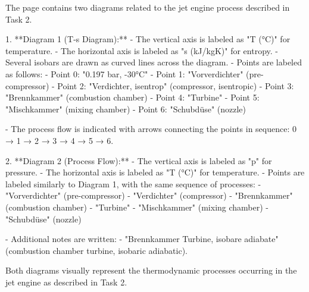 The page contains two diagrams related to the jet engine process described in Task 2.  

1. **Diagram 1 (T-s Diagram):**  
   - The vertical axis is labeled as "T (°C)" for temperature.  
   - The horizontal axis is labeled as "s (kJ/kgK)" for entropy.  
   - Several isobars are drawn as curved lines across the diagram.  
   - Points are labeled as follows:  
     - Point 0: "0.197 bar, -30°C"  
     - Point 1: "Vorverdichter" (pre-compressor)  
     - Point 2: "Verdichter, isentrop" (compressor, isentropic)  
     - Point 3: "Brennkammer" (combustion chamber)  
     - Point 4: "Turbine"  
     - Point 5: "Mischkammer" (mixing chamber)  
     - Point 6: "Schubdüse" (nozzle)  

   - The process flow is indicated with arrows connecting the points in sequence:  
     0 → 1 → 2 → 3 → 4 → 5 → 6.  

2. **Diagram 2 (Process Flow):**  
   - The vertical axis is labeled as "p" for pressure.  
   - The horizontal axis is labeled as "T (°C)" for temperature.  
   - Points are labeled similarly to Diagram 1, with the same sequence of processes:  
     - "Vorverdichter" (pre-compressor)  
     - "Verdichter" (compressor)  
     - "Brennkammer" (combustion chamber)  
     - "Turbine"  
     - "Mischkammer" (mixing chamber)  
     - "Schubdüse" (nozzle)  

   - Additional notes are written:  
     - "Brennkammer Turbine, isobare adiabate" (combustion chamber turbine, isobaric adiabatic).  

Both diagrams visually represent the thermodynamic processes occurring in the jet engine as described in Task 2.